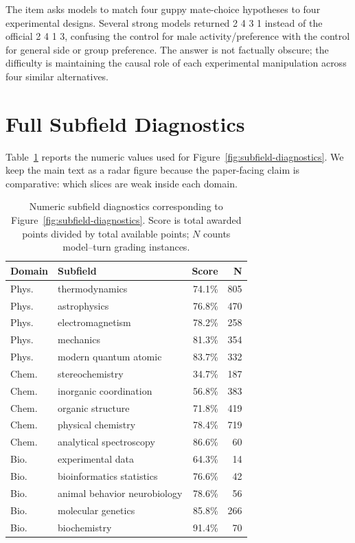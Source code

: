 \documentclass[11pt]{article}
\begin{document}
\begin{tcolorbox}[
  title={Biology: experimental-design matching error (IBO 2023 Item 20)},
  colback=gray!3,
  colframe=black!35,
  boxrule=0.6pt,
  arc=1.5mm,
  left=1.5mm,right=1.5mm,top=1mm,bottom=1mm
]
\footnotesize
The item asks models to match four guppy mate-choice hypotheses to four experimental designs.
Several strong models returned 2 4 3 1 instead of the official 2 4 1 3, confusing the control for male activity/preference with the control for general side or group preference.
The answer is not factually obscure; the difficulty is maintaining the causal role of each experimental manipulation across four similar alternatives.
\end{tcolorbox}

\section{Full Subfield Diagnostics}
\label{app:subfield_table}
Table~\ref{tab:subfield-diagnostics-full} reports the numeric values used for Figure~\ref{fig:subfield-diagnostics}.
We keep the main text as a radar figure because the paper-facing claim is comparative: which slices are weak inside each domain.

\begin{table}[h]
\centering
\small
\setlength{\tabcolsep}{3.5pt}
\begin{tabular}{llrr}
\toprule
\textbf{Domain} & \textbf{Subfield} & \textbf{Score} & \textbf{N} \\
\midrule
Phys. & thermodynamics & 74.1\% & 805 \\
Phys. & astrophysics & 76.8\% & 470 \\
Phys. & electromagnetism & 78.2\% & 258 \\
Phys. & mechanics & 81.3\% & 354 \\
Phys. & modern quantum atomic & 83.7\% & 332 \\
Chem. & stereochemistry & 34.7\% & 187 \\
Chem. & inorganic coordination & 56.8\% & 383 \\
Chem. & organic structure & 71.8\% & 419 \\
Chem. & physical chemistry & 78.4\% & 719 \\
Chem. & analytical spectroscopy & 86.6\% & 60 \\
Bio. & experimental data & 64.3\% & 14 \\
Bio. & bioinformatics statistics & 76.6\% & 42 \\
Bio. & animal behavior neurobiology & 78.6\% & 56 \\
Bio. & molecular genetics & 85.8\% & 266 \\
Bio. & biochemistry & 91.4\% & 70 \\
\bottomrule
\end{tabular}
\caption{Numeric subfield diagnostics corresponding to Figure~\ref{fig:subfield-diagnostics}. Score is total awarded points divided by total available points; $N$ counts model--turn grading instances.}
\label{tab:subfield-diagnostics-full}
\end{table}
\end{document}
